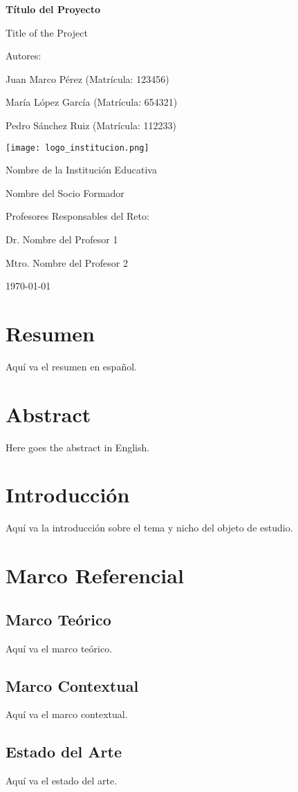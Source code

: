 \documentclass[a4paper,12pt]{report}
\begin{document}
\begin{titlepage}
    \centering
    {\Huge \bfseries Título del Proyecto \par}
    {\Large Title of the Project \par}
    \vspace{1cm}
    {\Large Autores: \par}
    \vspace{0.5cm}
    {\large Juan Marco Pérez (Matrícula: 123456) \par}
    {\large María López García (Matrícula: 654321) \par}
    {\large Pedro Sánchez Ruiz (Matrícula: 112233) \par}
    \vfill
    \texttt{[image: logo\_institucion.png]} \par
    \vspace{0.5cm}
    {\Large Nombre de la Institución Educativa \par}
    {\Large Nombre del Socio Formador \par}
    \vfill
    {\Large Profesores Responsables del Reto: \par}
    {\large Dr. Nombre del Profesor 1 \par}
    {\large Mtro. Nombre del Profesor 2 \par}
    \vfill
    {\large \today \par}
\end{titlepage}

\tableofcontents
\newpage

\chapter*{Resumen}
Aquí va el resumen en español.

\chapter*{Abstract}
Here goes the abstract in English.

\chapter{Introducción}
Aquí va la introducción sobre el tema y nicho del objeto de estudio.

\chapter{Marco Referencial}
\section{Marco Teórico}
Aquí va el marco teórico.

\section{Marco Contextual}
Aquí va el marco contextual.

\section{Estado del Arte}
Aquí va el estado del arte.
\end{document}

